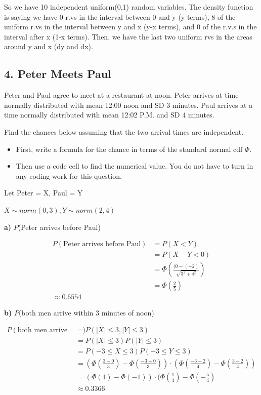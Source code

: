 \documentclass[11pt]{article}
\providecommand{\tightlist}{%
      \setlength{\itemsep}{0pt}\setlength{\parskip}{0pt}}
\begin{document}
So we have 10 independent uniform(0,1) random variables. The density function is saying we have 0 r.vs in the interval between 0 and y (y terms), 8 of the uniform r.vs in the interval between y and x (y-x terms), and 0 of the r.v.s in the interval after x (1-x terms). Then, we have the last two uniform rvs in the areas around y and x (dy and dx). 
    \newpage

    \subsection{4. Peter Meets Paul}\label{peter-meets-paul}

Peter and Paul agree to meet at a restaurant at noon. Peter arrives at
time normally distributed with mean 12:00 noon and SD 3 minutes. Paul
arrives at a time normally distributed with mean 12:02 P.M. and SD 4
minutes.

Find the chances below assuming that the two arrival times are
independent.

\begin{itemize}
\tightlist
\item
  First, write a formula for the chance in terms of the standard normal
  cdf \(\Phi\).
\item
  Then use a code cell to find the numerical value. You do not have to
  turn in any coding work for this question.
\end{itemize}

Let Peter = X, Paul = Y

$ X \sim norm(0, 3), Y \sim norm(2, 4) $ 

\textbf{a)} \(P\)(Peter arrives before Paul)

\begin{align*}
	P(\text{Peter arrives before Paul}) &= P(X < Y) \\
	&= P(X - Y < 0) \\
	&= \Phi\left( \frac{(0- (-2)}{\sqrt{3^{2} + 4^{2}}} \right)  \\
&= \Phi\left( \frac{2}{5} \right)  \\
\approx 0.6554
\end{align*}


\textbf{b)} \(P\)(both men arrive within 3 minutes of noon)


\begin{align*}
	P(\text{both men arrive within 3 minutes of noon}) &= P(|X| \le 3, |Y| \le 3) \\
	&= P(|X| \le 3) P(|Y| \le 3) \\
	&= P(-3 \le X \le 3) P(-3 \le Y \le 3) \\
	&= \left( \Phi(\frac{3-0}{3}) - \Phi(\frac{-3-0}{3}) \right) \cdot \left( \Phi(\frac{-3-2}{4}) - \Phi(\frac{3-2}{4}) \right)  \\
	&= (\Phi(1) - \Phi(-1)) \cdot ( \Phi(\frac{1}{4}) - \Phi(-\frac{5}{4})\\
	&\approx 0.3366 \\
\end{align*}
\end{document}
